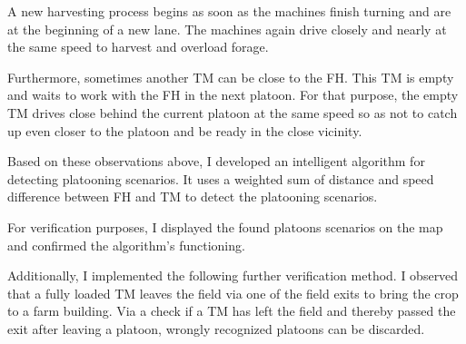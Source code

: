 A new harvesting process begins as soon as the machines finish turning and are at the beginning of a new lane.
The machines again drive closely and nearly at the same speed to harvest and overload forage.

Furthermore, sometimes another \ac{TM} can be close to the \ac{FH}. This \ac{TM} is empty and waits to work with the \ac{FH} in the next platoon. For that purpose, the empty \ac{TM} drives close behind the current platoon at the same speed so as not to catch up even closer to the platoon and be ready in the close vicinity.

Based on these observations above, I developed an intelligent algorithm for detecting platooning scenarios. It uses a weighted sum of distance and speed difference between \ac{FH} and \ac{TM} to detect the platooning scenarios.

For verification purposes, I displayed the found platoons scenarios on the map and confirmed the algorithm's functioning. 

Additionally, I implemented the following further verification method. 
I observed that a fully loaded \ac{TM} leaves the field via one of the field exits to bring the crop to a farm building. Via a
check if a \ac{TM} has left the field and thereby passed the exit after leaving a platoon,
wrongly recognized platoons can be discarded.

